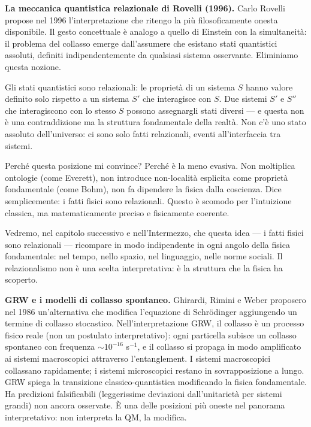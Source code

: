 \documentclass[12pt,a4paper,openany]{book}
\begin{document}
\textbf{La meccanica quantistica relazionale di Rovelli (1996).} Carlo Rovelli propose nel 1996 l'interpretazione che ritengo la più filosoficamente onesta disponibile. Il gesto concettuale è analogo a quello di Einstein con la simultaneità: il problema del collasso emerge dall'assumere che esistano stati quantistici assoluti, definiti indipendentemente da qualsiasi sistema osservante. Eliminiamo questa nozione.

Gli stati quantistici sono relazionali: le proprietà di un sistema $S$ hanno valore definito solo rispetto a un sistema $S'$ che interagisce con $S$. Due sistemi $S'$ e $S''$ che interagiscono con lo stesso $S$ possono assegnargli stati diversi — e questa non è una contraddizione ma la struttura fondamentale della realtà. Non c'è uno stato assoluto dell'universo: ci sono solo fatti relazionali, eventi all'interfaccia tra sistemi.

Perché questa posizione mi convince? Perché è la meno evasiva. Non moltiplica ontologie (come Everett), non introduce non-località esplicita come proprietà fondamentale (come Bohm), non fa dipendere la fisica dalla coscienza. Dice semplicemente: i fatti fisici sono relazionali. Questo è scomodo per l'intuizione classica, ma matematicamente preciso e fisicamente coerente.

Vedremo, nel capitolo successivo e nell'Intermezzo, che questa idea — i fatti fisici sono relazionali — ricompare in modo indipendente in ogni angolo della fisica fondamentale: nel tempo, nello spazio, nel linguaggio, nelle norme sociali. Il relazionalismo non è una scelta interpretativa: è la struttura che la fisica ha scoperto.

\textbf{GRW e i modelli di collasso spontaneo.} Ghirardi, Rimini e Weber proposero nel 1986 un'alternativa che modifica l'equazione di Schrödinger aggiungendo un termine di collasso stocastico. Nell'interpretazione GRW, il collasso è un processo fisico reale (non un postulato interpretativo): ogni particella subisce un collasso spontaneo con frequenza $\sim 10^{-16}$ s$^{-1}$, e il collasso si propaga in modo amplificato ai sistemi macroscopici attraverso l'entanglement. I sistemi macroscopici collassano rapidamente; i sistemi microscopici restano in sovrapposizione a lungo. GRW spiega la transizione classico-quantistica modificando la fisica fondamentale. Ha predizioni falsificabili (leggerissime deviazioni dall'unitarietà per sistemi grandi) non ancora osservate. È una delle posizioni più oneste nel panorama interpretativo: non interpreta la QM, la modifica.
\end{document}

